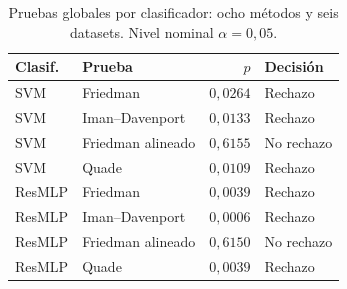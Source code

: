 \documentclass[11pt,a4paper]{article}
\begin{document}
\begin{table}[H]
\centering\fontsize{8}{10}\selectfont\setlength{\tabcolsep}{3.0pt}
\caption{Pruebas globales por clasificador: ocho métodos y seis datasets. Nivel nominal $\alpha=0{,}05$.}
\label{tab:sel-metodos-global}
\begin{tabular}{@{}llrl@{}}
\toprule
Clasif. & Prueba & $p$ & Decisión \\
\midrule
SVM & Friedman & $0{,}0264$ & Rechazo \\
SVM & Iman--Davenport & $0{,}0133$ & Rechazo \\
SVM & Friedman alineado & $0{,}6155$ & No rechazo \\
SVM & Quade & $0{,}0109$ & Rechazo \\
ResMLP & Friedman & $0{,}0039$ & Rechazo \\
ResMLP & Iman--Davenport & $0{,}0006$ & Rechazo \\
ResMLP & Friedman alineado & $0{,}6150$ & No rechazo \\
ResMLP & Quade & $0{,}0039$ & Rechazo \\
\bottomrule
\end{tabular}
\end{table}
\end{document}
